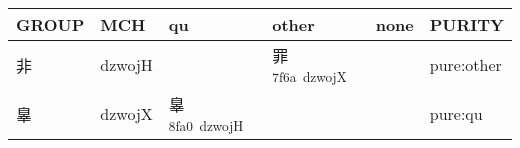\documentclass[14pt,a4paper]{scrartcl}
\begin{document}
\begin{longtable}[c]{@{}llllll@{}}
\toprule
\begin{minipage}[b]{0.14\columnwidth}\raggedright\strut
GROUP
\strut\end{minipage} &
\begin{minipage}[b]{0.14\columnwidth}\raggedright\strut
MCH
\strut\end{minipage} &
\begin{minipage}[b]{0.14\columnwidth}\raggedright\strut
qu
\strut\end{minipage} &
\begin{minipage}[b]{0.14\columnwidth}\raggedright\strut
other
\strut\end{minipage} &
\begin{minipage}[b]{0.14\columnwidth}\raggedright\strut
none
\strut\end{minipage} &
\begin{minipage}[b]{0.14\columnwidth}\raggedright\strut
PURITY
\strut\end{minipage}\tabularnewline
\midrule
\endhead
\begin{minipage}[t]{0.14\columnwidth}\raggedright\strut
非
\strut\end{minipage} &
\begin{minipage}[t]{0.14\columnwidth}\raggedright\strut
dzwojH
\strut\end{minipage} &
\begin{minipage}[t]{0.14\columnwidth}\raggedright\strut
\strut\end{minipage} &
\begin{minipage}[t]{0.14\columnwidth}\raggedright\strut
罪\textsuperscript{7f6a~dzwojX}
\strut\end{minipage} &
\begin{minipage}[t]{0.14\columnwidth}\raggedright\strut
\strut\end{minipage} &
\begin{minipage}[t]{0.14\columnwidth}\raggedright\strut
pure:other
\strut\end{minipage}\tabularnewline
\begin{minipage}[t]{0.14\columnwidth}\raggedright\strut
辠
\strut\end{minipage} &
\begin{minipage}[t]{0.14\columnwidth}\raggedright\strut
dzwojX
\strut\end{minipage} &
\begin{minipage}[t]{0.14\columnwidth}\raggedright\strut
辠\textsuperscript{8fa0~dzwojH}
\strut\end{minipage} &
\begin{minipage}[t]{0.14\columnwidth}\raggedright\strut
\strut\end{minipage} &
\begin{minipage}[t]{0.14\columnwidth}\raggedright\strut
\strut\end{minipage} &
\begin{minipage}[t]{0.14\columnwidth}\raggedright\strut
pure:qu
\strut\end{minipage}\tabularnewline
\bottomrule
\end{longtable}
\end{document}
